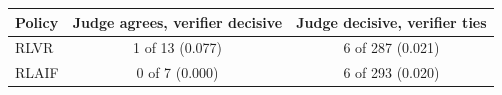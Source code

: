 \begin{tabular}{l c c}
  \toprule
  \textbf{Policy} & \textbf{Judge agrees, verifier decisive} & \textbf{Judge decisive, verifier ties} \\
  \midrule
    RLVR & 1 of 13 (0.077) & 6 of 287 (0.021) \\
    RLAIF & 0 of 7 (0.000) & 6 of 293 (0.020) \\
  \bottomrule
\end{tabular}
